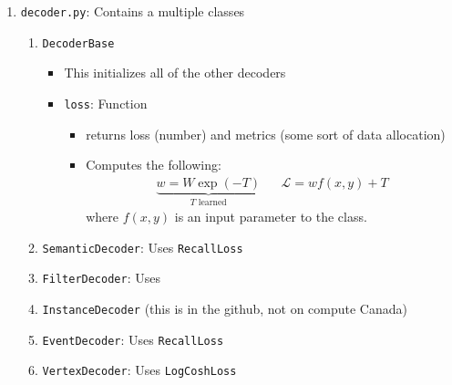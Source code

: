 \begin{itemize}
\begin{enumerate}
\begin{enumerate}
                    \item \texttt{decoder.py}: Contains a multiple classes
                        \begin{enumerate}
                            \item \texttt{DecoderBase}
                                \begin{itemize}
                                    \item This initializes all of the other decoders
                                    \item \texttt{loss}: Function
                                        \begin{itemize}
                                            \item returns loss (number) and metrics (some sort of data allocation)
                                            \item Computes the following:
                                            \begin{equation}
                                                \begin{aligned}
                                                    \underbrace{w = W\exp(-T)}_{T \text{ learned}} && \mathcal{L} = wf(x, y) + T
                                                \end{aligned}
                                            \end{equation}
                                            where $f(x, y)$ is an input parameter to the class.

                                        \end{itemize}
                                \end{itemize}

                            \item \texttt{SemanticDecoder}: Uses \texttt{RecallLoss}

                            \item \texttt{FilterDecoder}: Uses 

                            \item \texttt{InstanceDecoder} (this is in the github, not on compute Canada)

                            \item \texttt{EventDecoder}: Uses \texttt{RecallLoss}

                            \item \texttt{VertexDecoder}: Uses \texttt{LogCoshLoss}
                        \end{enumerate}
        


\end{enumerate}
\end{enumerate}
\end{itemize}
